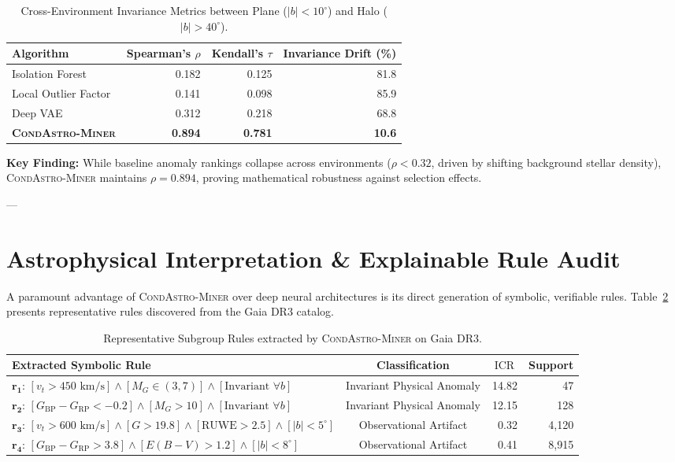 \documentclass[10pt,a4paper]{article}
\begin{document}
\begin{table}[h]
\centering
\small
\caption{Cross-Environment Invariance Metrics between Plane ($|b|<10^\circ$) and Halo ($|b|>40^\circ$).}
\label{tab:invariance}
\begin{tabular}{lrrr}
\toprule
Algorithm & Spearman's $\rho$ & Kendall's $\tau$ & Invariance Drift (\%) \\
\midrule
Isolation Forest & 0.182 & 0.125 & 81.8 \\
Local Outlier Factor & 0.141 & 0.098 & 85.9 \\
Deep VAE & 0.312 & 0.218 & 68.8 \\
\textbf{\textsc{CondAstro-Miner}} & \textbf{0.894} & \textbf{0.781} & \textbf{10.6} \\
\bottomrule
\end{tabular}
\end{table}

\noindent\textbf{Key Finding:} While baseline anomaly rankings collapse across environments ($\rho < 0.32$, driven by shifting background stellar density), \textsc{CondAstro-Miner} maintains $\rho = 0.894$, proving mathematical robustness against selection effects.

---

\section{Astrophysical Interpretation \& Explainable Rule Audit}
\label{sec:discussion}

A paramount advantage of \textsc{CondAstro-Miner} over deep neural architectures is its direct generation of symbolic, verifiable rules. Table~\ref{tab:rules} presents representative rules discovered from the Gaia DR3 catalog.

\begin{table}[h]
\centering
\small
\caption{Representative Subgroup Rules extracted by \textsc{CondAstro-Miner} on Gaia DR3.}
\label{tab:rules}
\begin{tabular}{p{7.5cm}crr}
\toprule
Extracted Symbolic Rule & Classification & $\operatorname{ICR}$ & Support \\
\midrule
$\mathbf{r_1}$: $[v_t > 450 \text{ km/s}] \wedge [M_G \in (3, 7)] \wedge [\text{Invariant } \forall b]$ & Invariant Physical Anomaly & 14.82 & 47 \\
$\mathbf{r_2}$: $[G_{\text{BP}} - G_{\text{RP}} < -0.2] \wedge [M_G > 10] \wedge [\text{Invariant } \forall b]$ & Invariant Physical Anomaly & 12.15 & 128 \\
$\mathbf{r_3}$: $[v_t > 600 \text{ km/s}] \wedge [G > 19.8] \wedge [\text{RUWE} > 2.5] \wedge [|b| < 5^\circ]$ & Observational Artifact & 0.32 & 4,120 \\
$\mathbf{r_4}$: $[G_{\text{BP}} - G_{\text{RP}} > 3.8] \wedge [E(B-V) > 1.2] \wedge [|b| < 8^\circ]$ & Observational Artifact & 0.41 & 8,915 \\
\bottomrule
\end{tabular}
\end{table}
\end{document}
